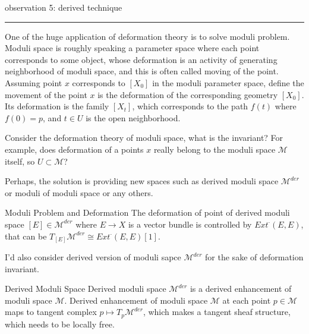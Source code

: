 \documentclass{article}
\begin{document}
observation 5:
derived technique \\



\vspace{0.5cm}
\noindent\rule{\textwidth}{0.4pt}
\vspace{0.5cm}

\noindent
One of the huge application of deformation theory is to solve moduli problem.
Moduli space is roughly speaking a parameter space where each point corresponds to some object,
whose deformation is an activity of generating neighborhood of moduli space, and this is often called moving of the point. \\

\noindent
Assuming point $x$ corresponds to $[X_0]$ in the moduli parameter space, define the movement of the point $x$ is the deformation of 
the corresponding geometry $[X_0]$. Its deformation is the family $[X_t]$, which corresponds to the path $f(t)$ where $f(0)=p$,
and $t\in U$ is the open neighborhood. \\

\begin{question}{}{}
Consider the deformation theory of moduli space, what is the invariant? For example,
does deformation of a points $x$ really belong to the moduli space $\mathcal{M}$ itself, so $U\subset \mathcal{M}$?
\end{question}

\noindent
Perhaps, the solution is providing new spaces such as derived moduli space $\mathcal{M}^{der}$ or moduli of moduli space or any others. \\


\begin{definition}{Moduli Problem and Deformation}{}
The deformation of point of derived moduli space $[E]\in\mathcal{M}^{der}$ where $E\to X$ is a vector bundle is 
controlled by $Ext^\cdot (E,E)$, that can be $T_{[E]}\mathcal{M}^{der} \cong Ext^\cdot (E,E)[1]$.
\end{definition}


\noindent
I'd also consider derived version of moduli sapce $\mathcal{M}^{der}$ for the sake of deformation invariant. \\


\begin{definition}{Derived Moduli Space}{}
Derived moduli space $\mathcal{M}^{der}$ is a derived enhancement of moduli space $\mathcal{M}$.
Derived enhancement of moduli space $\mathcal{M}$ at each point $p\in \mathcal{M}$ maps to tangent complex $p\mapsto T_p \mathcal{M}^{der}$,
which makes a tangent sheaf structure, which needs to be locally free.
\end{definition}
\end{document}
